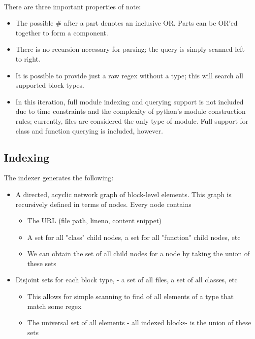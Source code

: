 \documentclass{article}
\begin{document}
\paragraph{}
There are three important properties of note:
	\begin{itemize}
	\item The possible \# after a part denotes an inclusive OR. Parts can be OR'ed together to form a component.
    \item There is no recursion necessary for parsing; the query is simply scanned left to right.
   	\item It is possible to provide just a raw regex without a type; this will search all supported block types.
    \item In this iteration, full module indexing and querying support is not included due to time constraints and the complexity of python's module construction rules; currently, files are considered the only type of module. Full support for class and function querying is included, however.
	\end{itemize}
	
\subsection{Indexing}
The indexer generates the following:
	\begin{itemize}
	\item A directed, acyclic network graph of block-level elements. This graph is recursively defined in terms of nodes. Every node contains
       \begin{itemize} 
       	\item The URL (file path, lineno, content snippet)
        \item A set for all "class" child nodes, a set for all "function" child nodes, etc
        \item We can obtain the set of all child nodes for a node by taking the union of these sets
       \end{itemize}
    \item Disjoint sets for each block type, - a set of all files, a set of all classes, etc
    	\begin{itemize}
    	\item This allows for simple scanning to find of all elements of a type that match some regex
    	\item The universal set of all elements - all indexed blocks- is the union of these sets
    	\end{itemize}
	\end{itemize}
\end{document}
